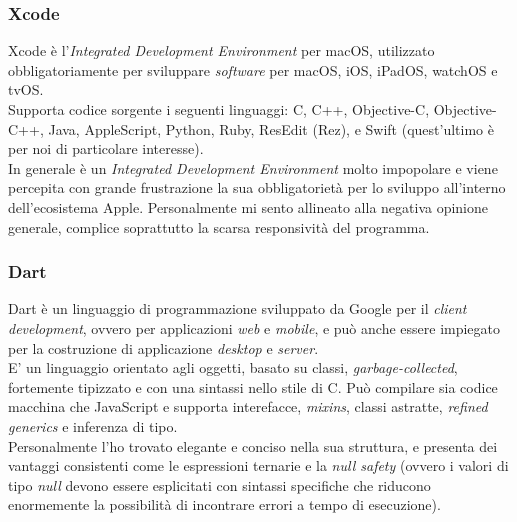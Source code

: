 \subsubsection{Xcode}
Xcode è l'\textit{Integrated Development Environment} per macOS, utilizzato obbligatoriamente per sviluppare \textit{software} per macOS, iOS, iPadOS, watchOS e tvOS.\\
Supporta codice sorgente i seguenti linguaggi: C, C++, Objective-C, Objective-C++, Java, AppleScript, Python, Ruby, ResEdit (Rez), e Swift (quest'ultimo è per noi di particolare interesse).\\
In generale è un \textit{Integrated Development Environment} molto impopolare e viene percepita con grande frustrazione la sua obbligatorietà per lo sviluppo all'interno dell'ecosistema Apple. Personalmente mi sento allineato alla negativa opinione generale, complice soprattutto la scarsa responsività del programma.


\subsubsection{Dart}
Dart è un linguaggio di programmazione sviluppato da Google per il \textit{client development}, ovvero per applicazioni \textit{web} e \textit{mobile}, e può anche essere impiegato per la costruzione di applicazione \textit{desktop} e \textit{server}.\\
E' un linguaggio orientato agli oggetti, basato su classi, \textit{garbage-collected}, fortemente tipizzato e con una sintassi nello stile di C. Può compilare sia codice macchina che JavaScript e supporta interefacce, \textit{mixins}, classi astratte, \textit{refined generics} e inferenza di tipo.\\
Personalmente l'ho trovato elegante e conciso nella sua struttura, e presenta dei vantaggi consistenti come le espressioni ternarie e la \textit{null safety} (ovvero i valori di tipo \textit{null} devono essere esplicitati con sintassi specifiche che riducono enormemente la possibilità di incontrare errori a tempo di esecuzione).

